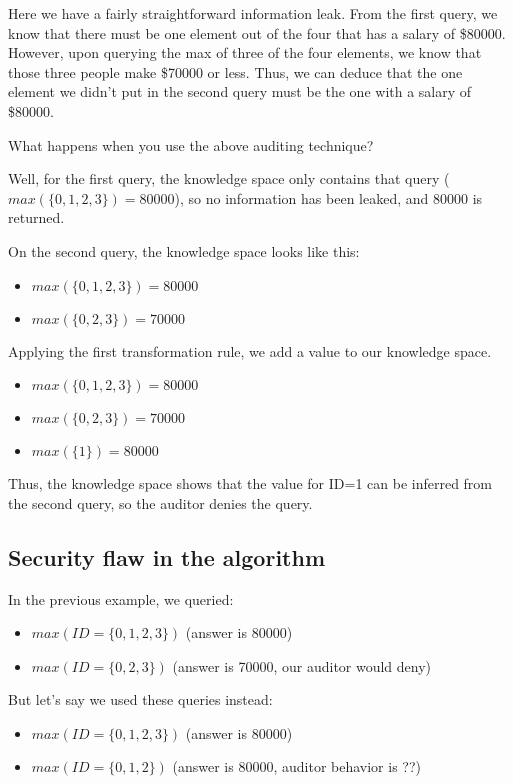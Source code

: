 \documentclass{article}
\begin{document}
Here we have a fairly straightforward information leak.
From the first query, we know that there must be one element out of the four that has a salary of \$80000.
However, upon querying the max of three of the four elements, we know that those three people make \$70000 or less.
Thus, we can deduce that the one element we didn't put in the second query must be the one with a salary of \$80000.

What happens when you use the above auditing technique?

Well, for the first query, the knowledge space only contains that query ($max(\{0, 1, 2, 3\}) = 80000$), so no information has been leaked, and 80000 is returned.

On the second query, the knowledge space looks like this:
\begin{itemize}
    \item $max(\{0, 1, 2, 3\}) = 80000$
    \item $max(\{0, 2, 3\}) = 70000$
\end{itemize}

Applying the first transformation rule, we add a value to our knowledge space.
\begin{itemize}
    \item $max(\{0, 1, 2, 3\}) = 80000$
    \item $max(\{0, 2, 3\}) = 70000$
    \item $max(\{1\}) = 80000$
\end{itemize}

Thus, the knowledge space shows that the value for ID=1 can be inferred from the second query, so the auditor denies the query.

\subsection{Security flaw in the algorithm}\label{sec:audit-oof}

In the previous example, we queried:
\begin{itemize}
    \item $max(ID=\{0, 1, 2, 3\})$ (answer is 80000)
    \item $max(ID=\{0, 2, 3\})$ (answer is 70000, our auditor would deny)
\end{itemize}

But let's say we used these queries instead:
\begin{itemize}
    \item $max(ID=\{0, 1, 2, 3\})$ (answer is 80000)
    \item $max(ID=\{0, 1, 2\})$ (answer is 80000, auditor behavior is ??)
\end{itemize}
\end{document}
